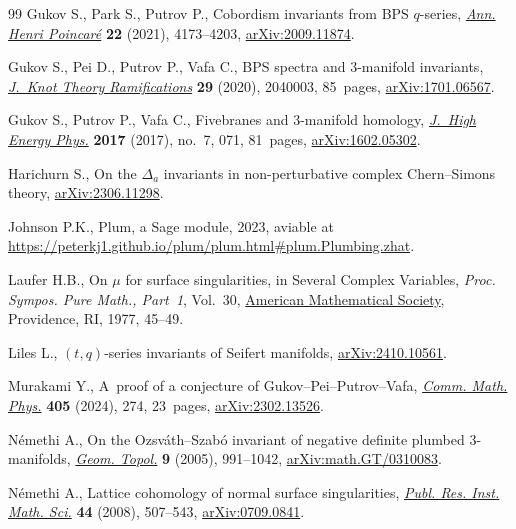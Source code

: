 \documentclass[pdftex]{sigma}
\begin{document}
\begin{thebibliography}{99}
Gukov S., Park S., Putrov P., Cobordism invariants from {BPS} {$q$}-series,
 \href{https://doi.org/10.1007/s00023-021-01089-2}{\textit{Ann. Henri
 Poincar\'e}} \textbf{22} (2021), 4173--4203,
 \href{http://arxiv.org/abs/2009.11874}{arXiv:2009.11874}.

Gukov S., Pei D., Putrov P., Vafa C., B{PS} spectra and 3-manifold invariants,
 \href{https://doi.org/10.1142/S0218216520400039}{\textit{J.~Knot Theory
 Ramifications}} \textbf{29} (2020), 2040003, 85~pages,
 \href{http://arxiv.org/abs/1701.06567}{arXiv:1701.06567}.

Gukov S., Putrov P., Vafa C., Fivebranes and 3-manifold homology,
 \href{https://doi.org/10.1007/JHEP07(2017)071}{\textit{J.~High Energy Phys.}}
 \textbf{2017} (2017), no.~7, 071, 81~pages,
 \href{http://arxiv.org/abs/1602.05302}{arXiv:1602.05302}.

Harichurn S., On the {$\Delta_a$} invariants in non-perturbative complex
 {C}hern--{S}imons theory,
 \href{http://arxiv.org/abs/2306.11298}{arXiv:2306.11298}.

Johnson P.K., Plum, a {S}age module, 2023, aviable at
 \url{https://peterkj1.github.io/plum/plum.html#plum.Plumbing.zhat}.

Laufer H.B., On {$\mu $} for surface singularities, in Several Complex
 Variables, \textit{Proc. Sympos. Pure Math., Part~1}, Vol.~30,
 \href{https://doi.org/10.1090/pspum/030.1/0450287}{American Mathematical
 Society}, Providence, RI, 1977, 45--49.

Liles L., $(t, q)$-series invariants of {S}eifert manifolds,
 \href{http://arxiv.org/abs/2410.10561}{arXiv:2410.10561}.

Murakami Y., A~proof of a conjecture of {G}ukov--{P}ei--{P}utrov--{V}afa,
 \href{https://doi.org/10.1007/s00220-024-05136-x}{\textit{Comm. Math. Phys.}}
 \textbf{405} (2024), 274, 23~pages,
 \href{http://arxiv.org/abs/2302.13526}{arXiv:2302.13526}.

N\'emethi A., On the {O}zsv\'ath--{S}zab\'o invariant of negative definite
 plumbed 3-manifolds,
 \href{https://doi.org/10.2140/gt.2005.9.991}{\textit{Geom. Topol.}}
 \textbf{9} (2005), 991--1042,
 \href{http://arxiv.org/abs/math.GT/0310083}{arXiv:math.GT/0310083}.

N\'emethi A., Lattice cohomology of normal surface singularities,
 \href{https://doi.org/10.2977/prims/1210167336}{\textit{Publ. Res. Inst.
 Math. Sci.}} \textbf{44} (2008), 507--543,
 \href{http://arxiv.org/abs/0709.0841}{arXiv:0709.0841}.


\end{thebibliography}
\end{document}
